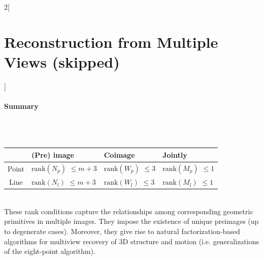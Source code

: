 \documentclass[oneside,fontsize=11pt,paper=a4]{scrartcl}
\begin{document}
\begin{multicols}{2}[\section{Reconstruction from Multiple Views (skipped)}]
\paragraph{Summary} \mbox{}\\
\vspace{1mm} \\
\renewcommand{\arraystretch}{1.1}%
\begin{tabularx}{\linewidth}{|c|Y|Y|Y|}
    \hline
     & (Pre) image &  Coimage & Jointly \\ \hline
     Point &  &   &  \\ \hline
     Line &  &   &  \\ \hline
\end{tabularx}
\renewcommand{\arraystretch}{1.0}%
\vspace{1mm} \\
These rank conditions capture the relationships among corresponding geometric primitives in multiple images. They impose the existence of unique preimages (up to degenerate cases). Moreover, they give rise to natural factorization-based algorithms for multiview recovery of 3D structure and motion (i.e. generalizations of the eight-point algorithm).
\end{multicols}
\end{document}
